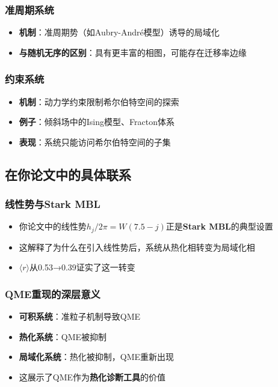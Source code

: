 \documentclass[11pt,a4paper]{article}
\begin{document}
\subsubsection{准周期系统}
\begin{itemize}
    \item \textbf{机制}：准周期势（如Aubry-André模型）诱导的局域化
    \item \textbf{与随机无序的区别}：具有更丰富的相图，可能存在迁移率边缘
\end{itemize}

\subsubsection{约束系统}
\begin{itemize}
    \item \textbf{机制}：动力学约束限制希尔伯特空间的探索
    \item \textbf{例子}：倾斜场中的Ising模型、Fracton体系
    \item \textbf{表现}：系统只能访问希尔伯特空间的子集
\end{itemize}

\subsection{在你论文中的具体联系}

\subsubsection{线性势与Stark MBL}
\begin{itemize}
    \item 你论文中的线性势$h_j/2\pi = W(7.5-j)$正是\textbf{Stark MBL}的典型设置
    \item 这解释了为什么在引入线性势后，系统从热化相转变为局域化相
    \item $\langle r \rangle$从0.53→0.39证实了这一转变
\end{itemize}

\subsubsection{QME重现的深层意义}
\begin{itemize}
    \item \textbf{可积系统}：准粒子机制导致QME
    \item \textbf{热化系统}：QME被抑制
    \item \textbf{局域化系统}：热化被抑制，QME重新出现
    \item 这展示了QME作为\textbf{热化诊断工具}的价值
\end{itemize}
\end{document}
